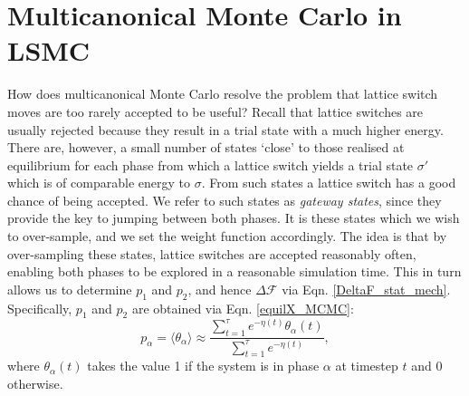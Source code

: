 \documentclass{report}
\begin{document}
\section{Multicanonical Monte Carlo in LSMC}\label{sec:multicanonical_LSMC}
How does multicanonical Monte Carlo resolve the problem that lattice switch moves are too rarely accepted to be useful? Recall that lattice switches
are usually rejected because they result in a trial state with a much higher energy.
There are, however, a small number of states `close' to those realised at equilibrium for each phase from which a lattice switch yields a 
trial state $\sigma'$ which is of comparable energy to $\sigma$. From such states a lattice switch has a good chance of being accepted.
We refer to such states as \emph{gateway states}, since they provide the key to jumping between both phases. It is these states which we wish to over-sample,
and we set the weight function accordingly. The idea is that by over-sampling these states, lattice switches are accepted reasonably often, 
enabling both phases to be explored in a reasonable simulation time. This in turn allows us to determine $p_1$ and $p_2$,
and hence $\Delta \mathcal{F}$ via Eqn. \eqref{DeltaF_stat_mech}. Specifically, $p_1$ and $p_2$ are obtained via Eqn. \eqref{equilX_MCMC}:
\begin{equation}
p_{\alpha}=\langle\theta_{\alpha}\rangle \approx \frac{\displaystyle\sum_{t=1}^{\tau}e^{-\eta(t)}\theta_{\alpha}(t)}{\displaystyle\sum_{t=1}^{\tau}e^{-\eta(t)}},
\end{equation}
where $\theta_{\alpha}(t)$ takes the value 1 if the system is in phase $\alpha$ at timestep $t$ and 0 otherwise.
\end{document}
